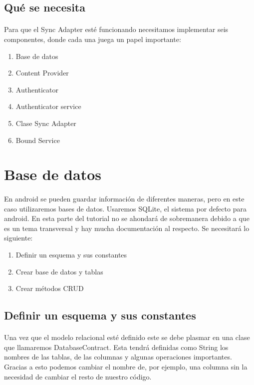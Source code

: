 \documentclass[10pt]{extarticle}
\begin{document}
\subsection{Qué se necesita}

\paragraph{}
Para que el Sync Adapter esté funcionando necesitamos implementar seis componentes, donde cada una juega un papel importante:

\begin{enumerate}
 \item Base de datos
 \item Content Provider
 \item Authenticator
 \item Authenticator service
 \item Clase Sync Adapter
 \item Bound Service
\end{enumerate}



\section{Base de datos}

\paragraph{}
En android se pueden guardar información de diferentes maneras, pero en este caso utilizaremos bases de datos. Usaremos SQLite, el sistema por defecto para android. En esta parte del tutorial no se ahondará de sobremanera debido a que es un tema transversal y hay mucha documentación al respecto. Se necesitará lo siguiente:

\begin{enumerate}
 \item Definir un esquema y sus constantes
 \item Crear base de datos y tablas
 \item Crear métodos CRUD
\end{enumerate}

\subsection{Definir un esquema y sus constantes}

\paragraph{}
Una vez que el modelo relacional esté definido este se debe plasmar en una clase que llamaremos DatabaseContract. Esta tendrá definidas como String los nombres de las tablas, de las columnas y algunas operaciones importantes. Gracias a esto podemos cambiar el nombre de, por ejemplo, una columna sin la necesidad de cambiar el resto de nuestro código.
\end{document}
